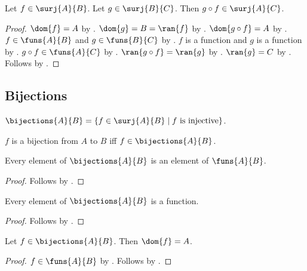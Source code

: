 \begin{proposition}\label{surjections_circ}
    Let $f\in\surj{A}{B}$.
    Let $g\in\surj{B}{C}$.
    Then $g\circ f\in\surj{A}{C}$.
\end{proposition}
\begin{proof}
    $\dom{f} = A$ by .
    $\dom{g} = B = \ran{f}$ by .
    $\dom{g\circ f} = A$ by .
    $f\in\funs{A}{B}$ and $g\in\funs{B}{C}$ by .
    $f$ is a function and $g$ is a function by .
    $g\circ f\in\funs{A}{C}$ by .
    $\ran{g\circ f}=\ran{g}$ by .
    $\ran{g}=C$ by .
    Follows by .
\end{proof}



\subsection{Bijections}

\begin{definition}\label{bijections}
    $\bijections{A}{B} = \{ f\in\surj{A}{B} \mid \text{$f$ is injective}\}$.
\end{definition}

\begin{abbreviation}\label{bijection}
    $f$ is a bijection from $A$ to $B$ iff $f\in\bijections{A}{B}$.
\end{abbreviation}

\begin{proposition}\label{bijections_to_funs}
    Every element of $\bijections{A}{B}$ is an element of $\funs{A}{B}$.
\end{proposition}
\begin{proof}
    Follows by .
\end{proof}

\begin{proposition}\label{bijection_is_function}
    Every element of $\bijections{A}{B}$ is a function.
\end{proposition}
\begin{proof}
    Follows by .
\end{proof}

\begin{proposition}\label{bijections_dom}
    Let $f\in\bijections{A}{B}$.
    Then $\dom{f} = A$.
\end{proposition}
\begin{proof}
    $f\in\funs{A}{B}$ by .
    Follows by .
\end{proof}


